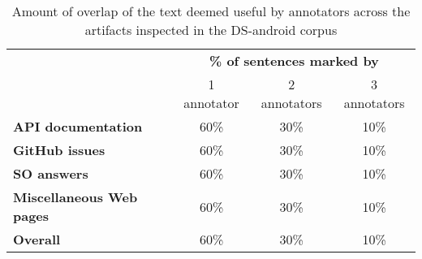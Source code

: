 \begin{table}[H]
\centering    
\caption{Amount of overlap of the text deemed useful by annotators across the artifacts inspected in the \acs{DS-android} corpus}
\label{tbl:corpus-annotation-overlap}
\begin{scriptsize}
\begin{threeparttable}
\begin{tabular}{lccc}





& \multicolumn{3}{c}{\textbf{\% of sentences marked by}}
\\ \cmidrule(l){2-4} 
& 1 annotator & 2 annotators & 3 annotators  \\

\hline

\textbf{API documentation} 
& 60\% & 30\% & 10\%
\\
\textbf{GitHub issues} 
& 60\% & 30\% & 10\%
\\
\textbf{SO answers} 
& 60\% & 30\% & 10\%
\\
\textbf{Miscellaneous Web pages} 
& 60\% & 30\% & 10\%
\\

\hline
\textbf{Overall} 
& 60\% & 30\% & 10\%
\\
\hline

\end{tabular}
\end{threeparttable}
\end{scriptsize}
\end{table}

